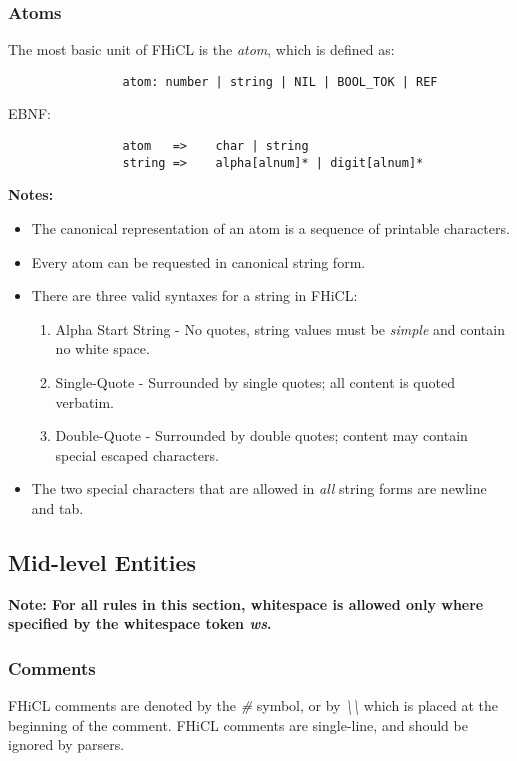 \documentclass{memarticle}
\begin{document}
		\subsubsection{Atoms}
			The most basic unit of FHiCL is the \emph{atom},
			which is defined as: 
			\begin{verbatim}
				atom: number | string | NIL | BOOL_TOK | REF
			\end{verbatim}
			\vspace{1mm}
			EBNF:
			\begin{verbatim}
				atom   =>    char | string
				string =>    alpha[alnum]* | digit[alnum]*
			\end{verbatim}
			\vspace{1mm}
			\par
			\bf Notes: \rm
			\begin{itemize}
				\item The canonical representation of an atom is a sequence of printable characters.
				\item Every atom can be requested in canonical string form.
				\item There are three valid syntaxes for a string in FHiCL:
				\begin{enumerate}
					\item Alpha Start String - No quotes, string values must be \emph{simple}
						and contain no white space.
					\item Single-Quote - Surrounded by single quotes;
						all content is quoted verbatim.
					\item Double-Quote - Surrounded by double quotes;
						content may contain special escaped characters.
				\end{enumerate}
				\item The two special characters that are allowed in \emph{all} string forms are newline and tab.
			\end{itemize}
			
	\subsection{Mid-level Entities}
		\bf Note: \rm For all rules in this section,
		whitespace is allowed only where specified by the whitespace token \emph{ws}.
		\subsubsection{Comments}
			FHiCL comments are denoted by the \emph{\#} symbol,
			or by \emph{\textbackslash\textbackslash}
			which is placed at the beginning of the comment.
			FHiCL comments are single-line,
			and should be ignored by parsers.
\end{document}
